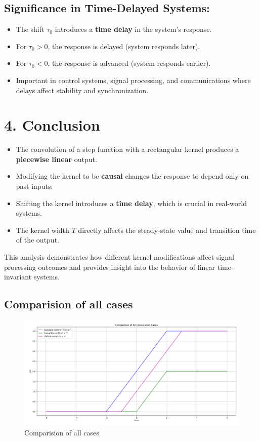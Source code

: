 \documentclass[12pt,a4paper,titlepage]{article}
\begin{document}
\subsection*{Significance in Time-Delayed Systems:}
\begin{itemize}
    \item The shift \( \tau_0 \) introduces a \textbf{time delay} in the system's response.
    \item For \( \tau_0 > 0 \), the response is delayed (system responds later).
    \item For \( \tau_0 < 0 \), the response is advanced (system responds earlier).
    \item Important in control systems, signal processing, and communications where delays affect stability and synchronization.
\end{itemize}

\section*{4. Conclusion}

\begin{itemize}
    \item The convolution of a step function with a rectangular kernel produces a \textbf{piecewise linear} output.
    \item Modifying the kernel to be \textbf{causal} changes the response to depend only on past inputs.
    \item Shifting the kernel introduces a \textbf{time delay}, which is crucial in real-world systems.
    \item The kernel width \( T \) directly affects the steady-state value and transition time of the output.
\end{itemize}

This analysis demonstrates how different kernel modifications affect signal processing outcomes and provides insight into the behavior of linear time-invariant systems.
\subsection*{Comparision of all cases}
\begin{figure}[H]
    \centering
    \includegraphics[width=0.8\linewidth]{plotsstep/comparsionof123.png}
    \caption{Comparision of all cases}
    \label{fig:enter-label}
\end{figure}
\end{document}
